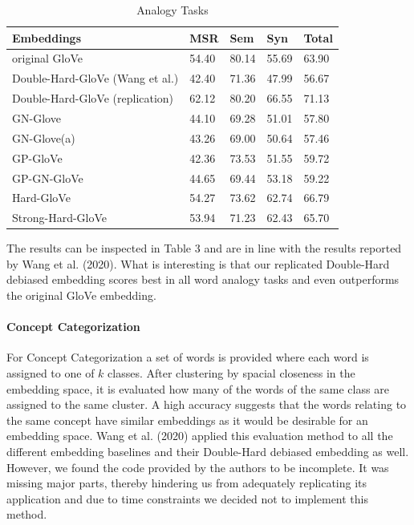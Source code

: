 \documentclass[
  english,
  man,floatsintext]{apa6}
\let\oldparagraph\paragraph
\renewcommand{\paragraph}[1]{\oldparagraph{#1}\mbox{}}
\begin{document}
\begin{table}[tbp]

\begin{center}
\begin{threeparttable}

\caption{\label{tab:table 3}Analogy Tasks}

\begin{tabular}{lllll}
\toprule
Embeddings & MSR & Sem & Syn & Total\\
\midrule
original GloVe & 54.40 & 80.14 & 55.69 & 63.90\\
Double-Hard-GloVe (Wang et al.) & 42.40 & 71.36 & 47.99 & 56.67\\
Double-Hard-GloVe (replication) & 62.12 & 80.20 & 66.55 & 71.13\\
GN-Glove & 44.10 & 69.28 & 51.01 & 57.80\\
GN-Glove(a) & 43.26 & 69.00 & 50.64 & 57.46\\
GP-GloVe & 42.36 & 73.53 & 51.55 & 59.72\\
GP-GN-GloVe & 44.65 & 69.44 & 53.18 & 59.22\\
Hard-GloVe & 54.27 & 73.62 & 62.74 & 66.79\\
Strong-Hard-GloVe & 53.94 & 71.23 & 62.43 & 65.70\\
\bottomrule
\end{tabular}

\end{threeparttable}
\end{center}

\end{table}

The results can be inspected in Table 3 and are in line with the results reported by Wang et al. (2020). What is interesting is that our replicated Double-Hard debiased embedding scores best in all word analogy tasks and even outperforms the original GloVe embedding.

\hypertarget{concept-categorization}{%
\paragraph{Concept Categorization}\label{concept-categorization}}

For Concept Categorization a set of words is provided where each word is assigned to one of \(k\) classes. After clustering by spacial closeness in the embedding space, it is evaluated how many of the words of the same class are assigned to the same cluster. A high accuracy suggests that the words relating to the same concept have similar embeddings as it would be desirable for an embedding space.
Wang et al. (2020) applied this evaluation method to all the different embedding baselines and their Double-Hard debiased embedding as well. However, we found the code provided by the authors to be incomplete. It was missing major parts, thereby hindering us from adequately replicating its application and due to time constraints we decided not to implement this method.
\end{document}
